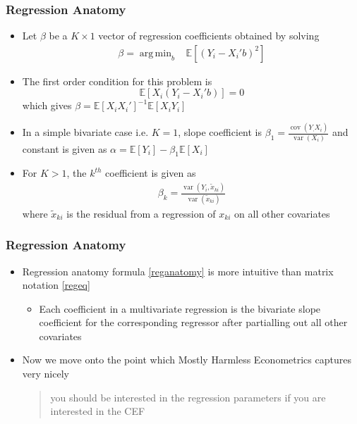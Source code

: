 \documentclass{beamer}
\theoremstyle{plain}
\DeclareMathOperator*{\argmin}{arg\,min}
\begin{document}
\begin{frame}
	\frametitle{Regression Anatomy}
	\begin{itemize}
		\item Let $\beta$ be a $K \times 1$ vector of regression coefficients obtained by solving
		\begin{align}\label{regeq}
			\beta = \argmin_b  \;\;\;\mathbb E[(Y_i - X_i'b)^2]
		\end{align}
		\item The first order condition for this problem is 
		$$\mathbb E[X_i(Y_i - X_i'b)] = 0 $$
		which gives $\beta = \mathbb E[X_iX_i']^{-1}\mathbb E[X_iY_i]$
		\item In a simple bivariate case i.e. $K = 1$,  slope coefficient is $\beta_1 = \frac{\operatorname{cov}(Y_, X_i)}{\operatorname{var}(X_i)}$ and constant is given as $\alpha = \mathbb E[Y_i] - \beta_1 \mathbb E[X_i]$
		\item For $K > 1$, the $k^{th}$ coefficient is given as 
		\begin{align}\label{reganatomy}
			\beta_k =\frac{\operatorname{var}(Y_i, \widetilde{x}_{ki})}{\operatorname{var}(\widetilde{x}_{ki})}
		\end{align}
		where $\widetilde{x}_{ki}$ is the residual from a regression of $x_{ki}$ on all other covariates 
	\end{itemize}
\end{frame}

\begin{frame}
	\frametitle{Regression Anatomy}
	\begin{itemize}
		\item Regression anatomy formula \eqref{reganatomy} is more intuitive than matrix notation \eqref{regeq}
		\begin{itemize}
			\item Each coefficient in a multivariate regression is the bivariate slope coefficient for the corresponding regressor after partialling out all other covariates
		\end{itemize}
		\item Now we move onto the point which Mostly Harmless Econometrics captures very nicely 
		\begin{quote}
			you should be interested in the regression parameters if you are interested in the CEF
		\end{quote}
	\end{itemize}
\end{frame}
\end{document}
